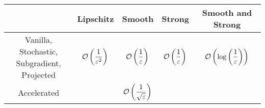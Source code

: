 \documentclass[12pt]{extarticle}
\numberwithin{equation}{subsection}
\begin{document}
\begin{table}[H]
	\centering
	\begin{tabular}{|c|c|c|c|c|}
		\hline
		                                                              &
		\textbf{Lipschitz}                                            &
		\textbf{Smooth}                                               &
		\textbf{Strong}                                               &
		\textbf{Smooth and Strong}
		\\
		\hline
		\makecell{Vanilla, Stochastic,
		\\ Subgradient, Projected}                   &
		$ \displaystyle \mathcal{O} \left(\frac{1}{\varepsilon^2} \right) $    &
		$ \displaystyle \mathcal{O} \left(\frac{1}{\varepsilon} \right)$       &
		$ \displaystyle \mathcal{O} \left(\frac{1}{\varepsilon} \right)$       &
		$ \displaystyle \mathcal{O} \left(\log\left(\frac{1}{\varepsilon} \right)\right)$
		\\
		\hline
		Accelerated                                                   &
		                                                              &
		$ \displaystyle \mathcal{O} \left(\frac{1}{\sqrt \varepsilon} \right)$ &
		                                                              &
		\\
		\hline
	\end{tabular}
\end{table}
\end{document}
